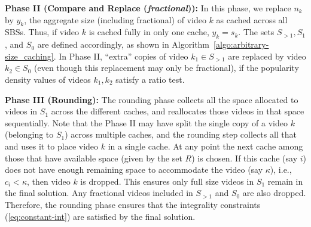 \documentclass[conference]{IEEEtran}
\begin{document}
\noindent \textbf{Phase II (Compare and Replace (\textit{fractional})):} 
In this phase, we replace $n_k$ by $y_k$, the aggregate size (including fractional) of video $k$ as cached across all SBSs. Thus, if video $k$ is cached fully in only one cache, $y_k = s_k$. The sets $S_{>1}, S_1$, and $S_0$ are defined accordingly, as shown in Algorithm~\ref{algo:arbitrary-size_caching}. In Phase II, ``extra'' copies of video $k_1 \in S_{>1}$ are replaced by video $k_2 \in S_0$ (even though this replacement may only be fractional), if the popularity density values  of videos $k_1, k_2$ satisfy a ratio test. 


\noindent \textbf{Phase III (Rounding):} The rounding phase collects all the space allocated to videos in $S_1$ across the different caches, and reallocates those videos in that space sequentially. Note that the Phase II may have split the single copy of a video $k$ (belonging to $S_1$) across multiple caches, and the rounding step collects all that and uses it to place video $k$ in a single cache. At any point the next cache among those that have available space (given by the set $R$) is chosen. If this cache (say $i$) does not have enough remaining space to accommodate the video (say $\kappa$), i.e., $c_i < \kappa$, then video $k$ is dropped. This ensures only full size videos in $S_1$ remain in the final solution. Any fractional videos included in $S_{>1}$ and $S_{0}$ are also dropped. Therefore, the rounding phase ensures that the integrality constraints (\ref{eq:constant-int}) are satisfied by the final solution.
\end{document}
